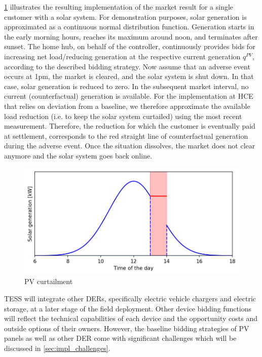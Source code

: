\documentclass[12pt]{article}{Definitions/mdpi}
\begin{document}
\cref{fig:pv_profile} illustrates the resulting implementation of the market result for a single customer with a solar system. For demonstration purposes, solar generation is approximated as a continuous normal distribution function. Generation starts in the early morning hours, reaches its maximum around noon, and terminates after sunset. The home hub, on behalf of the controller, continuously provides bids for increasing net load/reducing generation at the respective current generation $q^{PV}$, according to the described bidding strategy. Now assume that an adverse event occurs at 1pm, the market is cleared, and the solar system is shut down. In that case, solar generation is reduced to zero. In the subsequent market interval, no current (counterfactual) generation is available. For the implementation at HCE that relies on deviation from a baseline, we therefore approximate the available load reduction (i.e. to keep the solar system curtailed) using the most recent measurement. Therefore, the reduction for which the customer is eventually paid at settlement, corresponds to the red straight line of counterfactual generation during the adverse event. Once the situation dissolves, the market does not clear anymore and the solar system goes back online.

\begin{figure}[t]
\centering
\includegraphics[scale=0.8]{TESS_PV_reduction.png}
\caption{PV curtailment}
\label{fig:pv_profile}
\end{figure}

TESS will integrate other DERs, specifically electric vehicle chargers and electric storage, at a later stage of the field deployment. Other device bidding functions will reflect the technical capabilities of each device and the opportunity costs and outside options of their owners. However, the baseline bidding strategies of PV panels as well as other DER come with significant challenges which will be discussed in \cref{sec:impl_challenges}.
\end{document}
